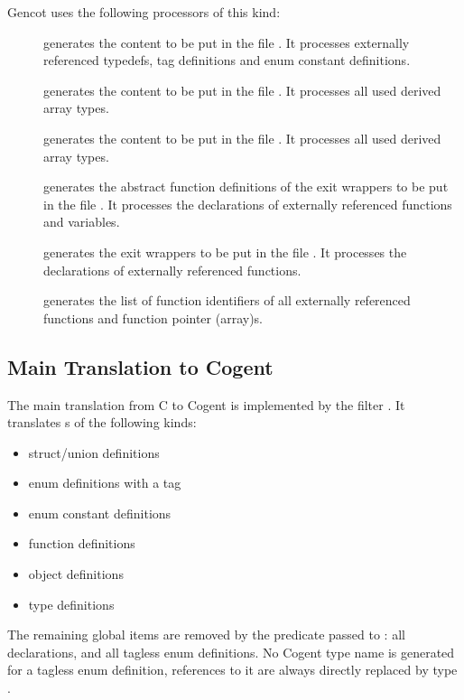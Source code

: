 Gencot uses the following processors of this kind:
\begin{description}
\item[] generates the content to be put in the file . It 
processes externally referenced typedefs, tag definitions and enum constant definitions.
\item[] generates the content to be put in the file . It 
processes all used derived array types.
\item[] generates the content to be put in the file . It 
processes all used derived array types.
\item[] generates the abstract function definitions of the exit wrappers to be put in the file 
. It processes the declarations of externally referenced functions and variables.
\item[] generates the exit wrappers to be put in the file . It processes
the declarations of externally referenced functions.
\item[] generates the list of function identifiers of all externally referenced functions and
function pointer (array)s.
\end{description}

\subsection{Main Translation to Cogent}
\label{impl-ccomps-main}

The main translation from C to Cogent is implemented by the filter . It translates s
of the following kinds:
\begin{itemize}
\item struct/union definitions
\item enum definitions with a tag
\item enum constant definitions
\item function definitions
\item object definitions
\item type definitions
\end{itemize}
The remaining global items are removed by the predicate passed to : all declarations, 
and all tagless enum definitions. No Cogent type name is generated for a tagless enum definition,
references to it are always directly replaced by type .

